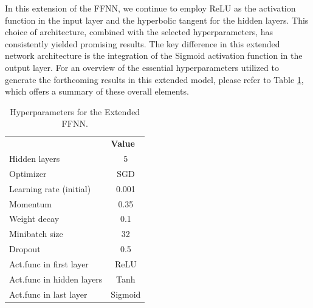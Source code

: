 \documentclass[a4paper, UKenglish, 11pt]{uiomaster}
\begin{document}
In this extension of the FFNN, we continue to employ ReLU as the activation function in the input layer and the hyperbolic tangent for the hidden layers. This choice of architecture, combined with the selected hyperparameters, has consistently yielded promising results. The key difference in this extended network architecture is the integration of the Sigmoid activation function in the output layer. For an overview of the essential hyperparameters utilized to generate the forthcoming results in this extended model, please refer to Table \ref{tab:parameters}, which offers a summary of these overall elements.


\begin{table}
\centering
\begin{tabular}{|lc|}
\hline
\rowcolor[HTML]{CBCEFB}
\multicolumn{2}{|c|}{\cellcolor[HTML]{CBCEFB}{\color[HTML]{000000} \textbf{Extended FFNN}}}    \\ \hline
\rowcolor[HTML]{EFEFEF}
\multicolumn{1}{|l|}{\cellcolor[HTML]{EFEFEF}\textbf{Hyperparameters}} & \multicolumn{1}{l|}{\cellcolor[HTML]{EFEFEF}\textbf{Value}} \\ \hline
\multicolumn{1}{|l|}{Hidden layers}                                    & 5                                                           \\ \hline
\multicolumn{1}{|l|}{Optimizer}                                        & SGD                                                         \\ \hline
\multicolumn{1}{|l|}{Learning rate (initial)}                          & 0.001                                                       \\ \hline
\multicolumn{1}{|l|}{Momentum}                                         & 0.35                                                        \\ \hline
\multicolumn{1}{|l|}{Weight decay}                                     & 0.1                                                         \\ \hline
\multicolumn{1}{|l|}{Minibatch size}                                   & 32                                                          \\ \hline
\multicolumn{1}{|l|}{Dropout}                                          & 0.5                                                         \\ \hline
\multicolumn{1}{|l|}{Act.func in first layer}                           & ReLU                                                        \\ \hline
\multicolumn{1}{|l|}{Act.func in hidden layers}                         & Tanh                                                        \\ \hline
\multicolumn{1}{|l|}{Act.func in last layer}                           & Sigmoid                                                        \\ \hline
\end{tabular}
\caption{Hyperparameters for the Extended FFNN.}
\label{tab:parameters}
\end{table}
\end{document}
